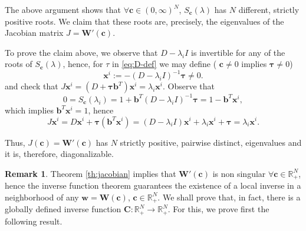 \documentclass[preprint]{elsarticle}
\theoremstyle{definition}
\newtheorem{remark}{Remark}[section]
\newcommand{\bw}{\boldsymbol w}
\newcommand{\bW}{\boldsymbol W}
\newcommand{\bc}{\boldsymbol c}
\newcommand{\bC}{\boldsymbol C}
\newcommand{\bx}{\boldsymbol x}
\newcommand{\bb}{\boldsymbol b}
\newcommand{\bt}{\boldsymbol \tau}
\begin{document}
\begin{pf}
The above argument shows that $\forall \bc \in (0,\infty)^N$,  $S_{\bc}(\lambda)$ has $N$ different,
strictly positive roots. We claim that these roots   are, precisely, the 
eigenvalues of  the Jacobian matrix $J=\bW'(\bc)$. 



To prove the claim above, we observe that $D-\lambda_i I$ is
invertible for any  of the roots of $S_{\bc}(\lambda)$,
hence, for $\tau$ in \eqref{eq:D-def}  we may  define ( $\bc\neq 0$
implies $\bt\neq 0$)  
\begin{equation*} \bx^{i}:= -(D-\lambda_i I)^{-1}\bt \neq 0.
\end{equation*}
and check that $J\bx^{i}=(D+\bt \bb^T)\bx^{i}=\lambda_i \bx^{i}$.
 Observe that 
\[0=S_{\bc}(\lambda_i)=1+\bb^T(D-\lambda_i I)^{-1}\bt= 1-\bb^T\bx^{i},
\]
which implies $\bb^T\bx^{i}=1$, 
hence
\[ J \bx^{i}= D\bx^{i} + \bt (\bb^T\bx^{i})= (D-\lambda_i I)\bx^{i}+\lambda_i \bx^{i} +\bt
= \lambda_i \bx^{i}. \]  

Thus, $J(\bc)={\boldsymbol   W}'({\boldsymbol c})$  has $N$ strictly positive,
pairwise distinct, eigenvalues and it is, therefore,  diagonalizable.
\end{pf}

\begin{remark}
Theorem \ref{th:jacobian} implies that
$\bW'(\bc)$ is  non
singular $\forall \bc \in \mathbb R^N_+$, hence  the inverse function theorem guarantees the existence
of a local inverse in a neighborhood of any $\bw=\bW(\bc)$, $\bc \in
\mathbb R^N_+$.
 We shall prove that, in fact,  there is a globally defined
inverse function $\bC: \mathbb R^N_+ \rightarrow \mathbb R^N_+$. For this, we
prove first the following result.
\end{remark}
\end{document}
